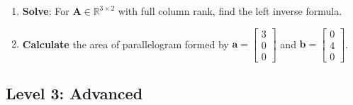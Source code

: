 \documentclass[12pt,a4paper]{article}
\theoremstyle{definition}
\begin{document}
\begin{enumerate}[resume]
\item \textbf{Solve}: For $\mathbf{A} \in \mathbb{R}^{3 \times 2}$ with full column rank, find the left inverse formula.

\item \textbf{Calculate} the area of parallelogram formed by $\mathbf{a} = \begin{bmatrix} 3 \\ 0 \\ 0 \end{bmatrix}$ and $\mathbf{b} = \begin{bmatrix} 0 \\ 4 \\ 0 \end{bmatrix}$.
\end{enumerate}

\subsection{Level 3: Advanced}
\end{document}
